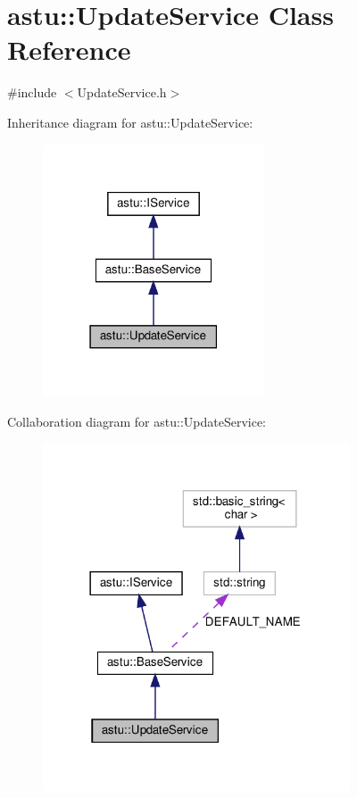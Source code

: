 \hypertarget{classastu_1_1UpdateService}{}\section{astu\+:\+:Update\+Service Class Reference}
\label{classastu_1_1UpdateService}


{\ttfamily \#include $<$Update\+Service.\+h$>$}



Inheritance diagram for astu\+:\+:Update\+Service\+:\nopagebreak
\begin{figure}[H]
\begin{center}
\leavevmode
\includegraphics[width=186pt]{classastu_1_1UpdateService__inherit__graph}
\end{center}
\end{figure}


Collaboration diagram for astu\+:\+:Update\+Service\+:\nopagebreak
\begin{figure}[H]
\begin{center}
\leavevmode
\includegraphics[width=258pt]{classastu_1_1UpdateService__coll__graph}
\end{center}
\end{figure}
